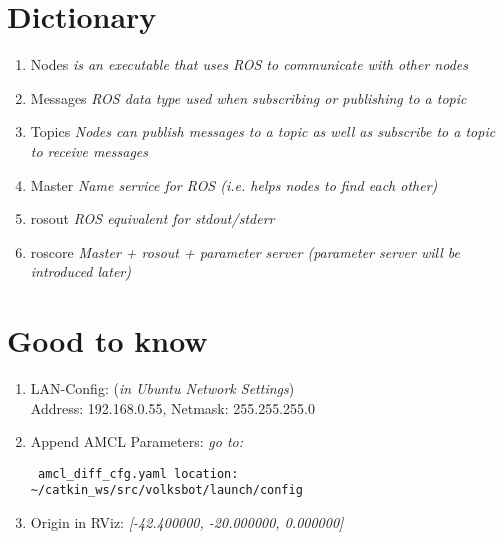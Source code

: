 \documentclass[11pt]{article}
\begin{document}
\section*{Dictionary}
\begin{enumerate}
    \item Nodes \textit{is an executable that uses ROS to communicate with other nodes} 
    \item Messages \textit{ROS data type used when subscribing or publishing to a topic}
    \item Topics \textit{Nodes can publish messages to a topic as well as subscribe to a topic to receive messages}
    \item Master \textit{Name service for ROS (i.e. helps nodes to find each other)}
    \item rosout \textit{ROS equivalent for stdout/stderr}
    \item roscore \textit{Master + rosout + parameter server (parameter server will be introduced later)}
\end{enumerate}
\section*{Good to know}
\begin{enumerate}
    \item LAN-Config: (\textit{in Ubuntu Network Settings})\\
    Address: 192.168.0.55, Netmask: 255.255.255.0
    \item Append AMCL Parameters:
    \textit{ go to:} \begin{verbatim} amcl_diff_cfg.yaml location: ~/catkin_ws/src/volksbot/launch/config \end{verbatim}
    \item Origin in RViz:
    \textit{ [-42.400000, -20.000000, 0.000000]}
\end{enumerate}
\end{document}
